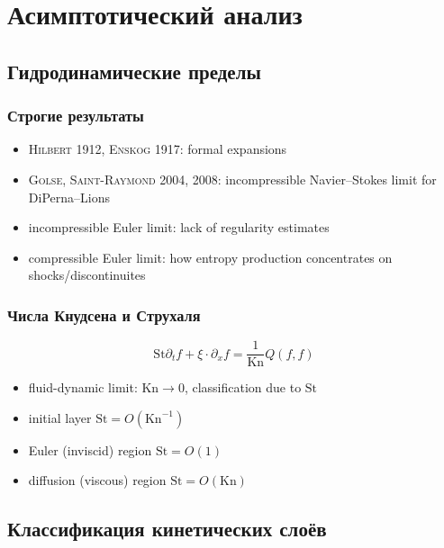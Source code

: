 \documentclass[mathserif]{beamer} %
\newcommand{\Kn}{\mathrm{Kn}}
\newcommand{\St}{\mathrm{St}}
\newcommand{\pder}[2][]{\partial_{#2}{#1}}
\newcommand{\OO}[1]{O(#1)}
\newcommand{\Cite}[2][]{\alert{\textsc{#2 #1}}}
\begin{document}
\section{Асимптотический анализ}

\subsection{Гидродинамические пределы}

\begin{frame}
    \frametitle{Строгие результаты}
    \begin{itemize}
        \item \Cite[1912]{Hilbert}, \Cite[1917]{Enskog}: formal expansions
        \item \Cite[2004, 2008]{Golse, Saint-Raymond}: incompressible Navier--Stokes limit for DiPerna--Lions
        \item incompressible Euler limit: lack of regularity estimates
        \item compressible Euler limit:\newline
        how entropy production concentrates on shocks/discontinuites
    \end{itemize}
\end{frame}

\begin{frame}
    \frametitle{Числа Кнудсена и Струхаля}
    \[ \St \pder[f]{t} + \xi\cdot\pder[f]{x} = \frac1{\Kn} Q(f,f)\]
    \begin{itemize}
        \item fluid-dynamic limit: \(\Kn\to0\), classification due to \(\St\)
        \item initial layer \(\St = \OO{\Kn^{-1}}\)
        \item Euler (inviscid) region \(\St = \OO{1}\)
        \item diffusion (viscous) region \(\St = \OO{\Kn}\)
    \end{itemize}
\end{frame}

\subsection{Классификация кинетических слоёв}
\end{document}
